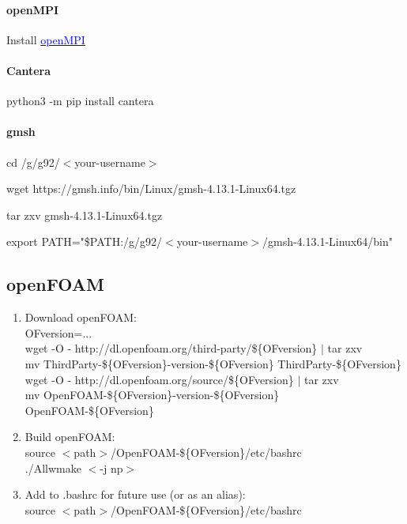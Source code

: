 \documentclass[a4paper, 12pt]{article}
\numberwithin{equation}{section}
\newcommand{\code}{\fontfamily{pcr}\selectfont}
\newcommand{\blue}[1]{\textcolor{blue}{#1}}
\begin{document}
        \paragraph{openMPI \\}
            Install \href{https://docs.open-mpi.org/en/v5.0.x/installing-open-mpi/quickstart.html}{\blue{openMPI}}

        \paragraph{Cantera \\}
            {\code python3 -m pip install cantera}

        \paragraph{gmsh \\}

            {\code cd /g/g92/$<$your-username$>$}

            {\code wget https://gmsh.info/bin/Linux/gmsh-4.13.1-Linux64.tgz}

            {\code tar zxv gmsh-4.13.1-Linux64.tgz}

            {\code export PATH="\$PATH:/g/g92/$<$your-username$>$/gmsh-4.13.1-Linux64/bin"}

    \subsection{openFOAM}
        \begin{enumerate}
        \item Download openFOAM: \\
        OFversion=... \\
        wget -O - http://dl.openfoam.org/third-party/\$\{OFversion\} $|$ tar zxv \\
        mv ThirdParty-\$\{OFversion\}-version-\$\{OFversion\} ThirdParty-\$\{OFversion\} \\
        wget -O - http://dl.openfoam.org/source/\$\{OFversion\} $|$ tar zxv \\
        mv OpenFOAM-\$\{OFversion\}-version-\$\{OFversion\} OpenFOAM-\$\{OFversion\} \\

        \item Build openFOAM: \\
        source $<$path$>$/OpenFOAM-\$\{OFversion\}/etc/bashrc \\
        ./Allwmake $<$-j np$>$

        \item Add to .bashrc for future use (or as an alias): \\
        source $<$path$>$/OpenFOAM-\$\{OFversion\}/etc/bashrc
        \end{enumerate}
\end{document}
